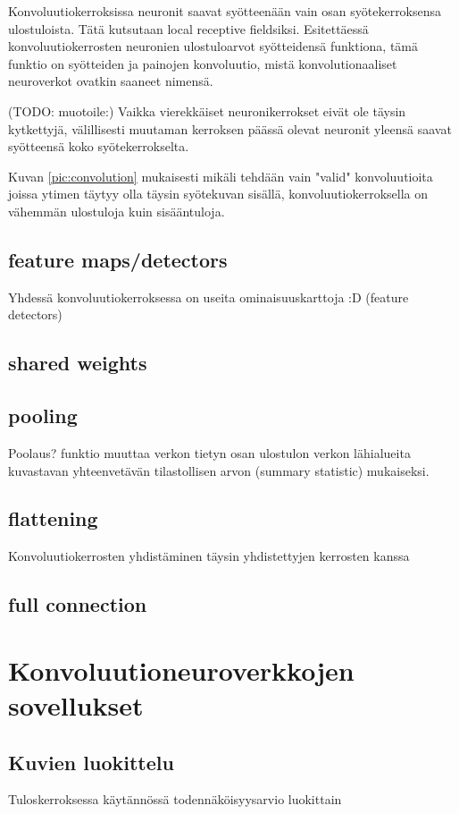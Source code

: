 \documentclass[finnish]{tktltiki2}
\theoremstyle{definition}
\theoremstyle{remark}
\begin{document}
  Konvoluutiokerroksissa neuronit saavat syötteenään vain osan syötekerroksensa ulostuloista. Tätä kutsutaan local receptive fieldsiksi. Esitettäessä konvoluutiokerrosten neuronien ulostuloarvot syötteidensä funktiona, tämä funktio on syötteiden ja painojen konvoluutio, mistä konvolutionaaliset neuroverkot ovatkin saaneet nimensä. 

  (TODO: muotoile:) Vaikka vierekkäiset neuronikerrokset eivät ole täysin kytkettyjä, välillisesti muutaman kerroksen päässä olevat neuronit yleensä saavat syötteensä koko syötekerrokselta.
  
  Kuvan \ref{pic:convolution} mukaisesti mikäli tehdään vain "valid" konvoluutioita joissa ytimen täytyy olla täysin syötekuvan sisällä, konvoluutiokerroksella on vähemmän ulostuloja kuin sisääntuloja.

  \subsection{feature maps/detectors}
  Yhdessä konvoluutiokerroksessa on useita ominaisuuskarttoja :D (feature detectors) 

  \subsection{shared weights}

  \subsection{pooling}
  Poolaus? funktio muuttaa verkon tietyn osan ulostulon verkon lähialueita kuvastavan yhteenvetävän tilastollisen arvon (summary statistic) mukaiseksi.
  \subsection{flattening}
  Konvoluutiokerrosten yhdistäminen täysin yhdistettyjen kerrosten kanssa

  \subsection{full connection}

  \section{Konvoluutioneuroverkkojen sovellukset}
  \subsection{Kuvien luokittelu}
  Tuloskerroksessa käytännössä todennäköisyysarvio luokittain
\end{document}
